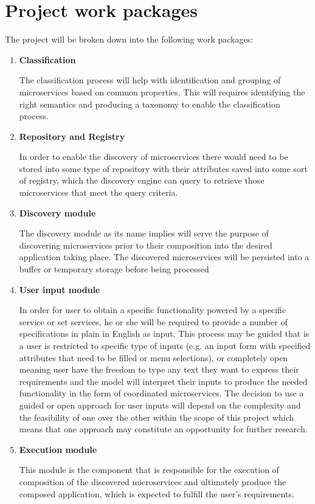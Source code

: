 \documentclass{article}
\begin{document}
\section{Project work packages}

The project will be broken down into the following work packages:

\begin{enumerate} 

\item \textbf{Classification}

The classification process will help with identification and grouping of microservices based on common properties. This will requires identifying the right semantics and producing a taxonomy to enable the classification process. 

\item \textbf{Repository and Registry}

In order to enable the discovery of microservices there would need to be stored into some type of repository with their attributes saved into some sort of registry, which the discovery engine can query to retrieve those microservices that meet the query criteria. 

\item \textbf{Discovery module}

The discovery module as its name implies will serve the purpose of discovering microservices prior to their composition into the desired application taking place. The discovered microservices will be persisted into a buffer or temporary storage before being processed 

\item \textbf{User input module}

In order for user to obtain a specific functionality powered by a specific service or set services, he or she will be required to provide a number of specifications in plain in English as input. This process may be guided that is a user is restricted to specific type of inputs (e.g. an input form with specified attributes that need to be filled or menu selections), or completely open meaning user have the freedom to type any text they want to express their requirements and the model will interpret their inputs to produce the needed functionality in the form of coordinated microservices. The decision to use a guided or open approach for user inputs will depend on the complexity and the feasibility of one over the other within the scope of this project which means that one approach may constitute an opportunity for further research.

\item \textbf{Execution module}

This module is the component that is responsible for the execution of composition of the discovered microservices and ultimately produce the composed application, which is expected to fulfill the user’s requirements.

\end{enumerate}
\end{document}
